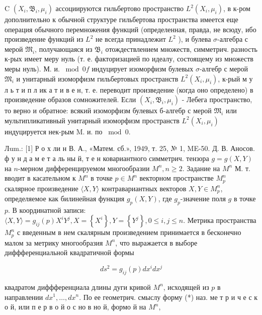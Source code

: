 \documentclass[10pt]{article}
\begin{document}
C $\left(X_{i}, \mathfrak{B}_{i}, \mu_{i}\right)$ ассоциируются гильбертово пространство $L^{2}\left(X_{i}, \mu_{i}\right)$, в к-ром дополнительно к обычной структуре гильбертова пространства имеется еще операция обычного перемножения функций (определенная, правда, не всюду, ибо произведение функций из $L^{2}$ не всегда принадлежит $L^{2}$ ), и булева $\sigma$-алгебра с мерой $\mathfrak{M}_{i}$, получающаяся из $\mathfrak{B}_{i}$ отождествлением множеств, симметрич. разность к-рых имеет меру нуль (т. е. факторизацией по идеалу, состоящему из множеств меры нуль). М. и. $\bmod 0 f$ индуцирует изоморфизм булевых $\sigma$-алгебр с мерой $\mathfrak{M}_{i}$ и унитарный изоморфизм гильбертовых пространств $L^{2}\left(X_{i}, \mu_{i}\right)$, к-рый м у л ь т и п л ик а т и в е н, т. е. переводит произведение (когда оно определено) в произведение образов сомножителей. Если $\left(X_{i}, \mathfrak{B}_{i}, \mu_{i}\right)$ - Лебега пространство, то верно и обратное: всякий изоморфизм булевых б-алгебр с мерой $\mathfrak{M}_{i}$ или мультипликативный унитарный изоморфизм пространств $L^{2}\left(X_{i}, \mu_{i}\right)$ индуцируется нек-рым M. и. по $\bmod 0$.



Лum.: [1] Р о х ли н В. А., «Матем. сб.», 1949, т. 25, № 1, ME-50. Д. В. Аносов. ф у н д а м е т а ль ны й, т е н ковариантного симметрич. тензора $g=g(X, Y)$ на $n$-мерном дифференцируемом многообразии $M^{n}, n \geqslant 2$. Задание на $M^{n}$ М. т. вводит в касательном к $M^{n}$ в точке $p \in M^{n}$ векторном пространстве $M_{p}^{n}$ скалярное произведение $\langle X, Y\rangle$ контравариантных векторов $X, Y \in M_{p}^{n}$, определяемое как билинейная функция $g_{p}(X, Y)$, где $g_{p}$-значение поля $g$ в точке $p$. В координатной записи: $\langle X, Y\rangle=g_{i j}(p) X^{i} Y^{j}, X=\left\{X^{i}\right\}, Y=\left\{Y^{j}\right\}, 0 \leqslant i, j \leqslant n$. Метрика пространства $M_{p}^{n}$ с введенным в нем скалярным произведением принимается в бесконечно малом за метрику многообразия $M^{n}$, что выражается в выборе диффференциальной квадратичной формы



\[

d s^{2}=g_{i j}(p) d x^{i} d x^{j}

\]



квадратом диффференциала длины дуги кривой $M^{n}$, исходящей из $p$ в направлении $d x^{1}, \ldots, d x^{n}$. По ее геометрич. смыслу форму (*) наз. ме т р и ч е с к о й, или п е р в о й о с но в но й, формо й на $M^{n}$,
\end{document}
